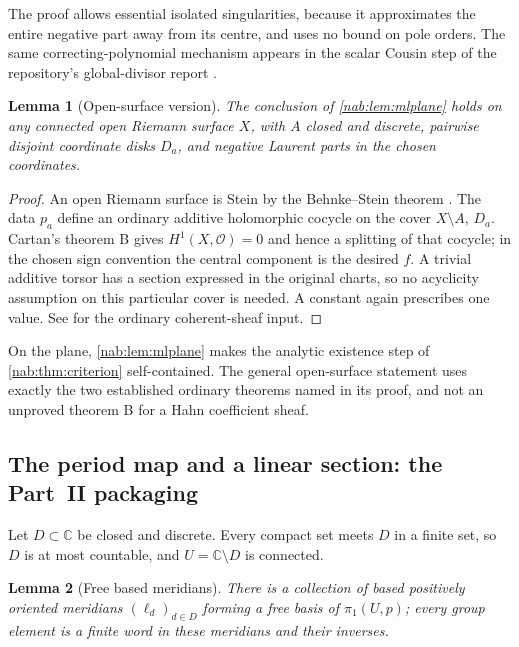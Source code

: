 \documentclass[11pt,letterpaper]{article}
\newtheorem{lemma}[lemma]{Lemma}
\theoremstyle{definition}
\theoremstyle{remark}
\newcommand{\C}{\mathbb C}
\newcommand{\OO}{\mathcal O}
\numberwithin{equation}{section}
\begin{document}
The proof allows essential isolated singularities, because it approximates the
entire negative part away from its centre, and uses no bound on pole orders.
The same correcting-polynomial mechanism appears in the scalar Cousin step of
the repository's global-divisor report \cite{RepoGlobal}.

\begin{lemma}[Open-surface version]\label{nab:lem:mlsurface}
The conclusion of \cref{nab:lem:mlplane} holds on any connected open Riemann
surface $X$, with $A$ closed and discrete, pairwise disjoint coordinate disks
$D_a$, and negative Laurent parts in the chosen coordinates.
\end{lemma}

\begin{proof}
An open Riemann surface is Stein by the Behnke--Stein theorem \cite{BS}. The
data $p_a$ define an ordinary additive holomorphic cocycle on the cover
$X\setminus A$, $D_a$. Cartan's theorem B gives $H^1(X,\OO)=0$ and hence a
splitting of that cocycle; in the chosen sign convention the central component
is the desired $f$. A trivial additive torsor has a section expressed in the
original charts, so no acyclicity assumption on this particular cover is
needed. A constant again prescribes one value. See \cite{Cartan,Schmitt} for
the ordinary coherent-sheaf input.
\end{proof}

On the plane, \cref{nab:lem:mlplane} makes the analytic existence step of
\cref{nab:thm:criterion} self-contained. The general open-surface statement
uses exactly the two established ordinary theorems named in its proof, and not
an unproved theorem B for a Hahn coefficient sheaf.

\subsection{The period map and a linear section: the Part~II packaging}

Let $D\subset\C$ be closed and discrete. Every compact set meets $D$ in a
finite set, so $D$ is at most countable, and $U=\C\setminus D$ is connected.

\begin{lemma}[Free based meridians]\label{nab:lem:free}
There is a collection of based positively oriented meridians
$(\ell_d)_{d\in D}$ forming a free basis of $\pi_1(U,p)$; every group element
is a finite word in these meridians and their inverses.
\end{lemma}
\end{document}
